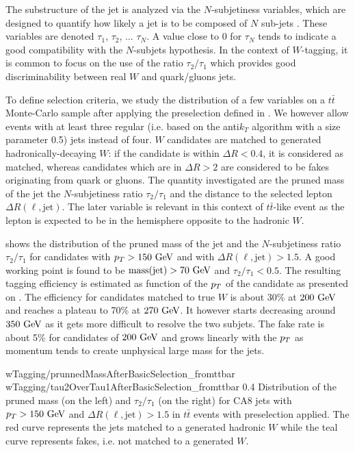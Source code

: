     The substructure of the jet is analyzed via the $N$-subjetiness variables,
    which are designed to quantify how likely a jet is to be composed of $N$
    sub-jets \cite{N-subjettiness}. These variables are denoted $\tau_1$,
    $\tau_2$, ... $\tau_N$. A value close to 0 for $\tau_N$ tends to indicate
    a good compatibility with the $N$-subjets hypothesis. In the context of
    $W$-tagging, it is common to focus on the use of the ratio $\tau_2/\tau_1$
    which provides good discriminability between real $W$ and quark/gluons jets.

    To define selection criteria, we study the distribution of a few variables
    on a $t\bar{t}$ Monte-Carlo sample after applying the preselection defined in
    . We however allow events with at
    least three regular (i.e. based on the anti$k_T$ algorithm with a size parameter 0.5) jets
    instead of four. $W$ candidates are matched to generated
    hadronically-decaying $W$: if the candidate is within $\Delta R < 0.4$, it
    is considered as matched, whereas candidates which are in $\Delta R > 2$ are
    considered to be fakes originating from quark or gluons.
    The quantity investigated are the pruned mass of the jet the $N$-subjetiness ratio
    $\tau_2 / \tau_1$ and the distance to the selected lepton $\Delta R (\ell,\text{jet})$.
    The later variable is relevant in this context of $t\bar{t}$-like event as the lepton
    is expected to be in the hemisphere opposite to the hadronic $W$.

     shows the distribution of the pruned mass of
    the jet and the $N$-subjetiness ratio $\tau_2 / \tau_1$ for candidates with
    $p_T > 150~\text{GeV}$ and with $\Delta R(\ell,\text{jet}) > 1.5$. A good working point
    is found to be $\text{mass}(\text{jet}) > 70~\text{GeV}$ and $\tau_2 / \tau_1 < 0.5$.
    The resulting tagging efficiency is estimated as function of the $p_T$ of the
    candidate as presented on .
    The efficiency for candidates matched
    to true $W$ is about 30\% at $200~\text{GeV}$ and reaches a plateau to 70\% at $270~\text{GeV}$. It
    however starts decreasing around $350~\text{GeV}$ as it gets more difficult to resolve
    the two subjets. The fake rate is about 5\% for candidates of $200~\text{GeV}$ and
    grows linearly with the $p_T$ as momentum tends to create unphysical large
    mass for the jets.

                     {wTagging/prunnedMassAfterBasicSelection_fromttbar}
                     {wTagging/tau2OverTau1AfterBasicSelection_fromttbar}
                     {0.4}
                     {Distribution of the pruned mass (on the left) and $\tau_2
                     / \tau_1$ (on the right) for CA8 jets with $p_T > 150~\text{GeV}$ and
                     $\Delta R(\ell,\text{jet}) > 1.5$ in $t\bar{t}$ events
                     with preselection applied. The red curve represents the
                     jets matched to a generated hadronic $W$ while the teal
                     curve represents fakes, i.e. not matched to a generated $W$.}

